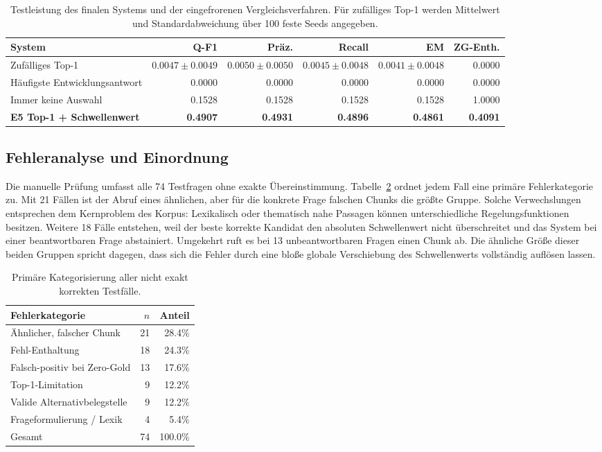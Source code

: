 \documentclass[11pt]{article}
\begin{document}
\begin{table}[t]
\centering
\small
\begin{tabular}{lrrrrr}
\toprule
\textbf{System} & \textbf{Q-F1} & \textbf{Präz.} & \textbf{Recall} & \textbf{EM} & \textbf{ZG-Enth.} \\
\midrule
Zufälliges Top-1 & $0.0047\pm0.0049$ & $0.0050\pm0.0050$ & $0.0045\pm0.0048$ & $0.0041\pm0.0048$ & 0.0000 \\
Häufigste Entwicklungsantwort & 0.0000 & 0.0000 & 0.0000 & 0.0000 & 0.0000 \\
Immer keine Auswahl & 0.1528 & 0.1528 & 0.1528 & 0.1528 & 1.0000 \\
\textbf{E5 Top-1 + Schwellenwert} & \textbf{0.4907} & \textbf{0.4931} & \textbf{0.4896} & \textbf{0.4861} & \textbf{0.4091} \\
\bottomrule
\end{tabular}
\caption{Testleistung des finalen Systems und der eingefrorenen Vergleichsverfahren. Für zufälliges Top-1 werden Mittelwert und Standardabweichung über 100 feste Seeds angegeben.}
\label{tab:baselines}
\end{table}

\subsection{Fehleranalyse und Einordnung}

Die manuelle Prüfung umfasst alle 74 Testfragen ohne exakte Übereinstimmung. Tabelle~\ref{tab:error-analysis} ordnet jedem Fall eine primäre Fehlerkategorie zu. Mit 21 Fällen ist der Abruf eines ähnlichen, aber für die konkrete Frage falschen Chunks die größte Gruppe. Solche Verwechslungen entsprechen dem Kernproblem des Korpus: Lexikalisch oder thematisch nahe Passagen können unterschiedliche Regelungsfunktionen besitzen. Weitere 18 Fälle entstehen, weil der beste korrekte Kandidat den absoluten Schwellenwert nicht überschreitet und das System bei einer beantwortbaren Frage abstainiert. Umgekehrt ruft es bei 13 unbeantwortbaren Fragen einen Chunk ab. Die ähnliche Größe dieser beiden Gruppen spricht dagegen, dass sich die Fehler durch eine bloße globale Verschiebung des Schwellenwerts vollständig auflösen lassen.

\begin{table}[t]
\centering
\small
\begin{tabular}{lrr}
\toprule
\textbf{Fehlerkategorie} & \textbf{$n$} & \textbf{Anteil} \\
\midrule
Ähnlicher, falscher Chunk & 21 & 28.4\% \\
Fehl-Enthaltung & 18 & 24.3\% \\
Falsch-positiv bei Zero-Gold & 13 & 17.6\% \\
Top-1-Limitation & 9 & 12.2\% \\
Valide Alternativbelegstelle & 9 & 12.2\% \\
Frageformulierung / Lexik & 4 & 5.4\% \\
\midrule
Gesamt & 74 & 100.0\% \\
\bottomrule
\end{tabular}
\caption{Primäre Kategorisierung aller nicht exakt korrekten Testfälle.}
\label{tab:error-analysis}
\end{table}
\end{document}
